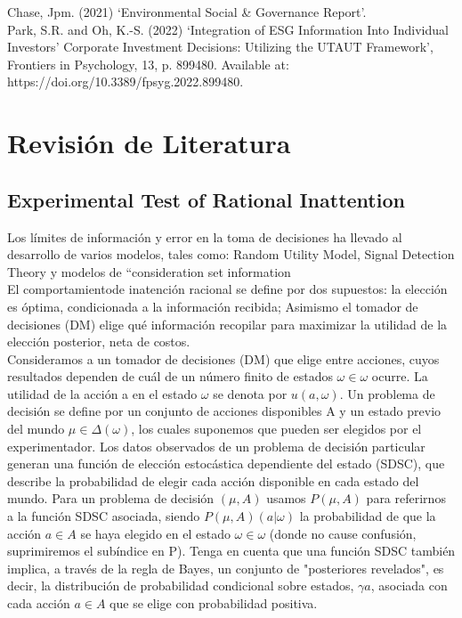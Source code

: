 \documentclass[11pt,letterpaper]{article}
\begin{document}
\noindent Chase, Jpm. (2021) ‘Environmental Social \& Governance Report’.\\

\noindent Park, S.R. and Oh, K.-S. (2022) ‘Integration of ESG Information Into Individual Investors’ Corporate Investment Decisions: Utilizing the UTAUT Framework’, Frontiers in Psychology, 13, p. 899480. Available at: https://doi.org/10.3389/fpsyg.2022.899480.\\



\section{Revisión de Literatura}


\subsection{Experimental Test of Rational Inattention}

Los límites de información y error en la toma de decisiones ha llevado al desarrollo de varios modelos, tales como: Random Utility Model, Signal Detection Theory y modelos de “consideration set information\\

El comportamientode inatención racional se define por dos supuestos: la elección es óptima, condicionada a la información recibida; Asimismo el tomador de decisiones (DM) elige qué información recopilar para maximizar la utilidad de la elección posterior, neta de costos.\\

Consideramos a un tomador de decisiones (DM) que elige entre acciones, cuyos resultados dependen de cuál de un número finito de estados $\omega \in \omega$ ocurre. La utilidad de la acción a en el estado $\omega$ se denota por $u(a, \omega)$. Un problema de decisión se define por un conjunto de acciones disponibles A y un estado previo del mundo $\mu \in \Delta(\omega)$, los cuales suponemos que pueden ser elegidos por el experimentador. Los datos observados de un problema de decisión particular generan una función de elección estocástica dependiente del estado (SDSC), que describe la probabilidad de elegir cada acción disponible en cada estado del mundo. Para un problema de decisión $(\mu, A)$ usamos $P(\mu,A)$ para referirnos a la función SDSC asociada, siendo $P(\mu,A)(a|\omega)$ la probabilidad de que la acción $a \in A$ se haya elegido en el estado $\omega \in \omega$ (donde no cause confusión, suprimiremos el subíndice en P). Tenga en cuenta que una función SDSC también implica, a través de la regla de Bayes, un conjunto de "posteriores revelados", es decir, la distribución de probabilidad condicional sobre estados, $\gamma a$, asociada con cada acción $a \in A$ que se elige con probabilidad positiva.\\
\end{document}

